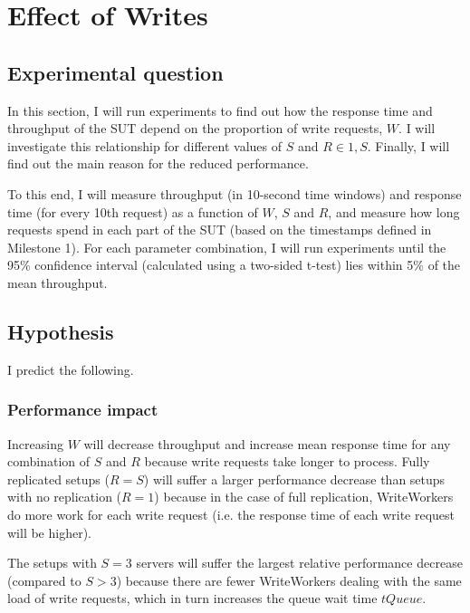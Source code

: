 \documentclass[11pt]{article}
\begin{document}
\section{Effect of Writes}
\label{sec:exp3}

\subsection{Experimental question}

In this section, I will run experiments to find out how the response time and throughput of the SUT depend on the proportion of write requests, $W$. I will investigate this relationship for different values of $S$ and $R \in {1, S}$. Finally, I will find out the main reason for the reduced performance.

To this end, I will measure throughput (in 10-second time windows) and response time (for every 10th request) as a function of $W$, $S$ and $R$, and measure how long requests spend in each part of the SUT (based on the timestamps defined in Milestone 1). For each parameter combination, I will run experiments until the 95\% confidence interval (calculated using a two-sided t-test) lies within 5\% of the mean throughput.

\subsection{Hypothesis}

I predict the following.

\subsubsection{Performance impact}
Increasing $W$ will decrease throughput and increase mean response time for any combination of $S$ and $R$ because write requests take longer to process. Fully replicated setups ($R=S$) will suffer a larger performance decrease than setups with no replication ($R=1$) because in the case of full replication, WriteWorkers do more work for each write request (i.e. the response time of each write request will be higher).

The setups with $S=3$ servers will suffer the largest relative performance decrease (compared to $S > 3$) because there are fewer WriteWorkers dealing with the same load of write requests, which in turn increases the queue wait time $tQueue$.
\end{document}
